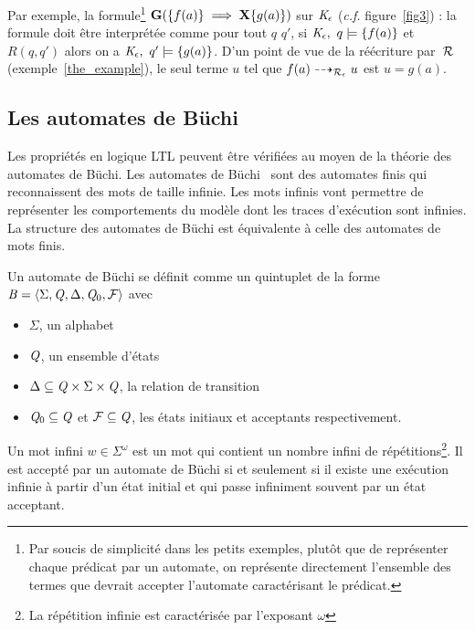Par exemple, la formule\footnote{\footnotesize Par soucis de simplicité dans les 
  petits exemples, plutôt que de représenter chaque prédicat par un automate, on représente directement 
  l'ensemble des termes que devrait accepter l'automate caractérisant le prédicat.}
  $\mathbf G(\{f(a)\} \; \Longrightarrow \; \mathbf X \{g(a)\})$ sur $\mathit K_\epsilon$ (\textit{c.f.} figure~\ref{fig3}) : la formule
doit être interprétée comme pour tout $q$ $q'$, si $\mathit K_\epsilon,\ q \models \{f(a)\}$ et $R(q, q')$ alors
on a  $\mathit K_\epsilon,\ q' \models \{g(a)\}$. D'un point de vue de la réécriture par~$\mathcal R$ (exemple~\ref{the_example}), le seul terme
$u$ tel que $f(a) \dashrightarrow_{\mathcal R_\epsilon} u$ est $u = g(a)$.


\subsection{Les automates de Büchi}


Les propriétés en logique LTL peuvent être vérifiées au moyen de la théorie des automates de Büchi.
Les automates de Büchi~\cite{Buchi} sont des automates finis qui reconnaissent des mots de taille infinie. 
Les mots infinis vont permettre de représenter les comportements du modèle dont les traces d'exécution
sont infinies. La structure des automates de Büchi est équivalente à celle des automates de mots finis.

\begin{definition}
  Un automate de Büchi se définit comme un quintuplet de la forme $\mathit B = \langle \Sigma, \mathit Q, \Delta, \mathit Q_0, \mathcal{F}\rangle$
  avec
  \begin{itemize}
  \item $\Sigma$, un alphabet
  \item $\mathit Q$, un ensemble d'états 
  \item $\Delta \subseteq \mathit Q \times \Sigma \times \mathit Q$, la relation de transition
  \item $\mathit Q_0 \subseteq \mathit Q$ et $\mathcal{F} \subseteq \mathit Q$, les états initiaux et acceptants respectivement.
  \end{itemize}
\end{definition}
Un mot infini $w \in \Sigma^\omega$ est un mot qui contient un nombre
infini de répétitions\footnote{\footnotesize La répétition infinie est
  caractérisée par l'exposant $\omega$}. Il est accepté par un
automate de Büchi si et seulement si il existe une exécution infinie à
partir d'un état initial et qui passe infiniment souvent par un état
acceptant.

